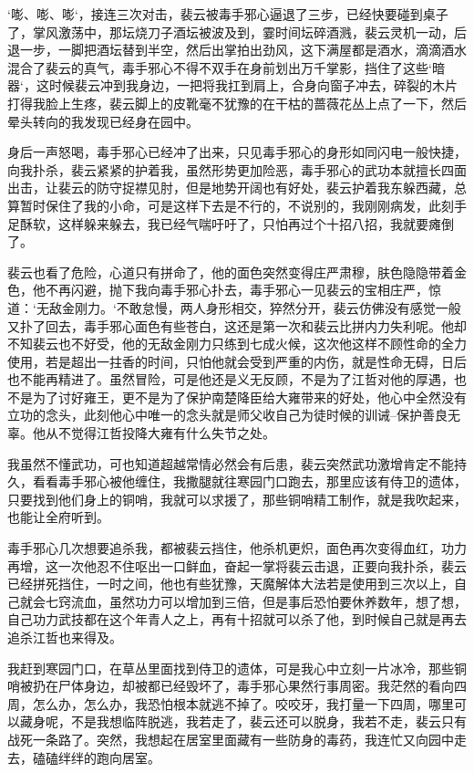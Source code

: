 ‘嘭、嘭、嘭‘，接连三次对击，裴云被毒手邪心逼退了三步，已经快要碰到桌子了，掌风激荡中，那坛烧刀子酒坛被波及到，霎时间坛碎酒溅，裴云灵机一动，后退一步，一脚把酒坛替到半空，然后出掌拍出劲风，这下满屋都是酒水，滴滴酒水混合了裴云的真气，毒手邪心不得不双手在身前划出万千掌影，挡住了这些‘暗器‘，这时候裴云冲到我身边，一把将我扛到肩上，合身向窗子冲去，碎裂的木片打得我脸上生疼，裴云脚上的皮靴毫不犹豫的在干枯的蔷薇花丛上点了一下，然后晕头转向的我发现已经身在园中。

身后一声怒喝，毒手邪心已经冲了出来，只见毒手邪心的身形如同闪电一般快捷，向我扑杀，裴云紧紧的护着我，虽然形势更加险恶，毒手邪心的武功本就擅长四面出击，让裴云的防守捉襟见肘，但是地势开阔也有好处，裴云护着我东躲西藏，总算暂时保住了我的小命，可是这样下去是不行的，不说别的，我刚刚病发，此刻手足酥软，这样躲来躲去，我已经气喘吁吁了，只怕再过个十招八招，我就要瘫倒了。

裴云也看了危险，心道只有拼命了，他的面色突然变得庄严肃穆，肤色隐隐带着金色，他不再闪避，抛下我向毒手邪心扑去，毒手邪心一见裴云的宝相庄严，惊道：‘无敌金刚力。‘不敢怠慢，两人身形相交，猝然分开，裴云仿佛没有感觉一般又扑了回去，毒手邪心面色有些苍白，这还是第一次和裴云比拼内力失利呢。他却不知裴云也不好受，他的无敌金刚力只练到七成火候，这次他这样不顾性命的全力使用，若是超出一拄香的时间，只怕他就会受到严重的内伤，就是性命无碍，日后也不能再精进了。虽然冒险，可是他还是义无反顾，不是为了江哲对他的厚遇，也不是为了讨好雍王，更不是为了保护南楚降臣给大雍带来的好处，他心中全然没有立功的念头，此刻他心中唯一的念头就是师父收自己为徒时候的训诫--保护善良无辜。他从不觉得江哲投降大雍有什么失节之处。

我虽然不懂武功，可也知道超越常情必然会有后患，裴云突然武功激增肯定不能持久，看看毒手邪心被他缠住，我撒腿就往寒园门口跑去，那里应该有侍卫的遗体，只要找到他们身上的铜哨，我就可以求援了，那些铜哨精工制作，就是我吹起来，也能让全府听到。

毒手邪心几次想要追杀我，都被裴云挡住，他杀机更炽，面色再次变得血红，功力再增，这一次他忍不住呕出一口鲜血，奋起一掌将裴云击退，正要向我扑杀，裴云已经拼死挡住，一时之间，他也有些犹豫，天魔解体大法若是使用到三次以上，自己就会七窍流血，虽然功力可以增加到三倍，但是事后恐怕要休养数年，想了想，自己功力武技都在这个年青人之上，再有十招就可以杀了他，到时候自己就是再去追杀江哲也来得及。

我赶到寒园门口，在草丛里面找到侍卫的遗体，可是我心中立刻一片冰冷，那些铜哨被扔在尸体身边，却被都已经毁坏了，毒手邪心果然行事周密。我茫然的看向四周，怎么办，怎么办，我恐怕根本就逃不掉了。咬咬牙，我打量一下四周，哪里可以藏身呢，不是我想临阵脱逃，我若走了，裴云还可以脱身，我若不走，裴云只有战死一条路了。突然，我想起在居室里面藏有一些防身的毒药，我连忙又向园中走去，磕磕绊绊的跑向居室。

